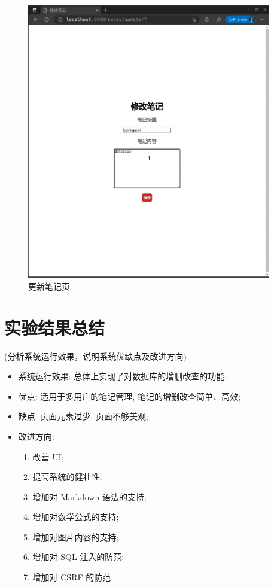 \begin{figure}[H]
  \begin{center}
    \includegraphics[width=0.95\textwidth]{./figures/update_note_page.png}
  \end{center}
  \caption{更新笔记页}
\end{figure}

\section{实验结果总结}
(分析系统运行效果，说明系统优缺点及改进方向)

\begin{itemize}
  \item 系统运行效果: 总体上实现了对数据库的增删改查的功能;
  \item 优点: 适用于多用户的笔记管理, 笔记的增删改查简单、高效;
  \item 缺点: 页面元素过少, 页面不够美观;
  \item 改进方向:
    \begin{enumerate}
      \item 改善 UI;
      \item 提高系统的健壮性;
      \item 增加对 Markdown 语法的支持;
      \item 增加对数学公式的支持;
      \item 增加对图片内容的支持;
      \item 增加对 SQL 注入的防范;
      \item 增加对 CSRF 的防范.
    \end{enumerate}
\end{itemize}

